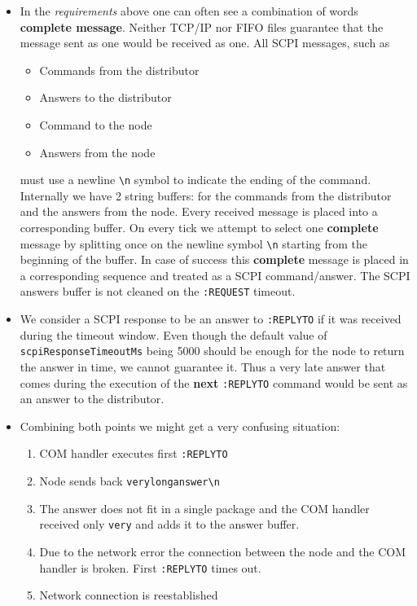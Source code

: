 \begin{itemize}
	\item{
		In the \textit{requirements} above one can often see a combination of words \textbf{complete message}. Neither TCP/IP nor FIFO files guarantee that the message sent as one would be received as one. All SCPI messages, such as
		\begin{itemize}
			\item Commands from the distributor
			\item Answers to the distributor
			\item Command to the node
			\item Answers from the node
		\end{itemize}
		must use a newline \texttt{\textbackslash n} symbol to indicate the ending of the command. Internally we have 2 string buffers: for the commands from the distributor and the answers from the node. Every received message is placed into a corresponding buffer. On every tick we attempt to select one \textbf{complete} message by splitting once on the newline symbol \texttt{\textbackslash n} starting from the beginning of the buffer. In case of success this \textbf{complete} message is placed in a corresponding sequence and treated as a SCPI command/answer. The SCPI answers buffer is not cleaned on the \texttt{:REQUEST} timeout.
	}
	\item We consider a SCPI response to be an answer to \texttt{:REPLYTO} if it was received during the timeout window. Even though the default value of \texttt{scpiResponseTimeoutMs} being 5000 should be enough for the node to return the answer in time, we cannot guarantee it. Thus a very late answer that comes during the execution of the \textbf{next} \texttt{:REPLYTO} command would be sent as an answer to the distributor.
	\item{
		Combining both points we might get a very confusing situation:
		\begin{enumerate}
			\item COM handler executes first \texttt{:REPLYTO}
			\item Node sends back \texttt{verylonganswer\textbackslash n}
			\item The answer does not fit in a single package and the COM handler received only \texttt{very} and adds it to the answer buffer.
			\item Due to the network error the connection between the node and the COM handler is broken. First \texttt{:REPLYTO} times out.
			\item Network connection is reestablished

\end{enumerate}}
\end{itemize}
